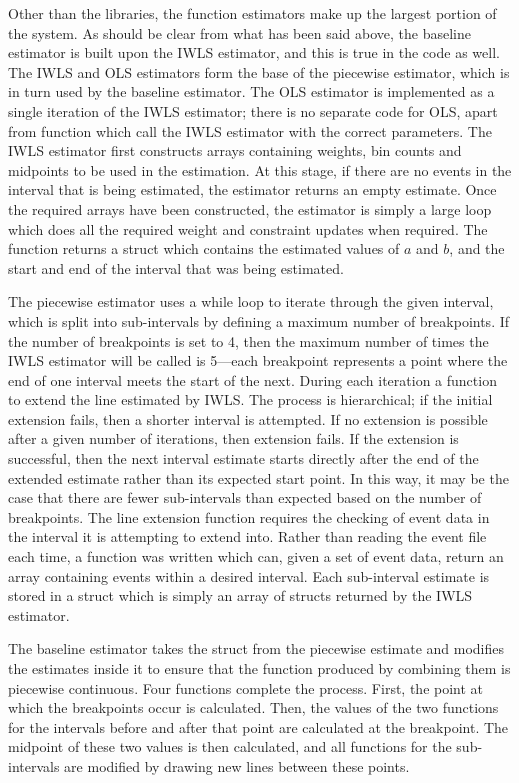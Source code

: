 \documentclass[a4paper,11pt]{article}
\begin{document}
   Other than the libraries, the function estimators make up the largest portion
   of the system. As should be clear from what has been said above, the baseline
   estimator is built upon the IWLS estimator, and this is true in the code as
   well. The IWLS and OLS estimators form the base of the piecewise estimator,
   which is in turn used by the baseline estimator. The OLS estimator is
   implemented as a single iteration of the IWLS estimator; there is no separate
   code for OLS, apart from function which call the IWLS estimator with the
   correct parameters. The IWLS estimator first constructs arrays containing
   weights, bin counts and midpoints to be used in the estimation. At this
   stage, if there are no events in the interval that is being estimated, the
   estimator returns an empty estimate. Once the required arrays have been
   constructed, the estimator is simply a large loop which does all the required
   weight and constraint updates when required. The function returns a struct
   which contains the estimated values of $a$ and $b$, and the start and end of
   the interval that was being estimated.

   The piecewise estimator uses a while loop to iterate through the given
   interval, which is split into sub-intervals by defining a maximum number of
   breakpoints. If the number of breakpoints is set to 4, then the maximum
   number of times the IWLS estimator will be called is 5---each breakpoint
   represents a point where the end of one interval meets the start of the
   next. During each iteration a function to extend the line estimated by
   IWLS. The process is hierarchical; if the initial extension fails, then a
   shorter interval is attempted. If no extension is possible after a given
   number of iterations, then extension fails. If the extension is successful,
   then the next interval estimate starts directly after the end of the extended
   estimate rather than its expected start point. In this way, it may be the
   case that there are fewer sub-intervals than expected based on the number of
   breakpoints. The line extension function requires the checking of event data
   in the interval it is attempting to extend into. Rather than reading the
   event file each time, a function was written which can, given a set of event
   data, return an array containing events within a desired interval. Each
   sub-interval estimate is stored in a struct which is simply an array of
   structs returned by the IWLS estimator.

   The baseline estimator takes the struct from the piecewise estimate and
   modifies the estimates inside it to ensure that the function produced by
   combining them is piecewise continuous. Four functions complete the
   process. First, the point at which the breakpoints occur is calculated. Then,
   the values of the two functions for the intervals before and after that point
   are calculated at the breakpoint. The midpoint of these two values is then
   calculated, and all functions for the sub-intervals are modified by drawing
   new lines between these points.
\end{document}

